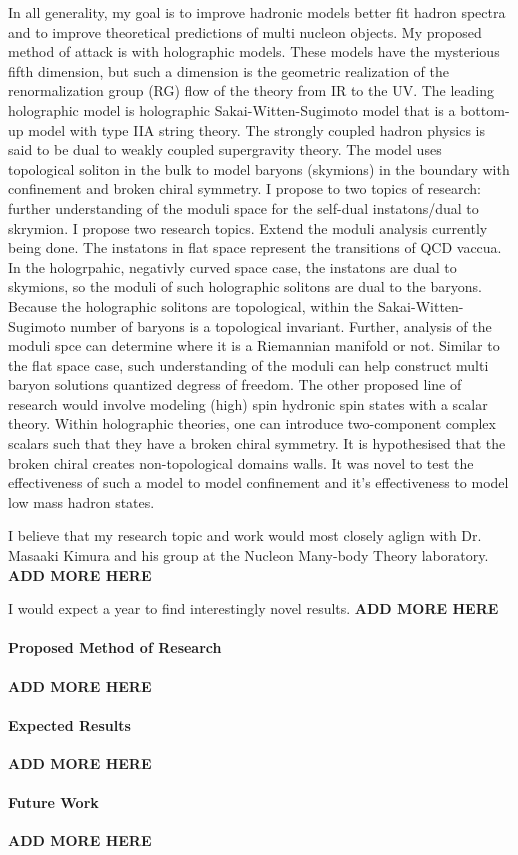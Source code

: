 \documentclass[12pt]{article}
\begin{document}
In all generality, my goal is to improve hadronic models better fit hadron spectra and to improve theoretical predictions of multi nucleon objects. 
%
My proposed method of attack is with holographic models.
%
These models have the mysterious fifth dimension, but such a dimension is the geometric realization of the renormalization group (RG) flow of the theory from IR to the UV.
%
The leading holographic model is holographic Sakai-Witten-Sugimoto model that is a bottom-up model with type IIA string theory.
%
The strongly coupled hadron physics is said to be dual to weakly coupled supergravity theory.
%
The model uses topological soliton in the bulk to model baryons (skymions) in the boundary with confinement and broken chiral symmetry.
%
I propose to two topics of research: further understanding of the moduli space for the self-dual instatons/dual to skrymion.
%
I propose two research topics.
%
Extend the moduli analysis currently being done.
%
The instatons in flat space represent the transitions of QCD vaccua.
%
In the hologrpahic, negativly curved space case, the instatons are dual to skymions, so the moduli of such holographic solitons are dual to the baryons.
%
Because the holographic solitons are topological, within the Sakai-Witten-Sugimoto number of baryons is a topological invariant.
%
Further, analysis of the moduli spce can determine where it is a Riemannian manifold or not.
%
Similar to the flat space case, such understanding of the moduli can help construct multi baryon solutions quantized degress of freedom.
%
The other proposed line of research would involve modeling (high) spin hydronic spin states with a scalar theory.
%
Within holographic theories, one can introduce two-component complex scalars such that they have a broken chiral symmetry.
%
It is hypothesised that the broken chiral creates non-topological domains walls.
%
It was novel to test the effectiveness of such a model to model confinement and it's effectiveness to model low mass hadron states.

I believe that my research topic and work would most closely aglign with Dr. Masaaki Kimura and his group at the Nucleon Many-body Theory laboratory.
%
\large{\bf{ADD MORE HERE}}

I would expect a year to find interestingly novel results. 
%
\large{\bf{ADD MORE HERE}}

\paragraph{Proposed Method of Research}

\large{\bf{ADD MORE HERE}}

\paragraph{Expected Results}

\large{\bf{ADD MORE HERE}}

\paragraph{Future Work}

\large{\bf{ADD MORE HERE}}
\end{document}
